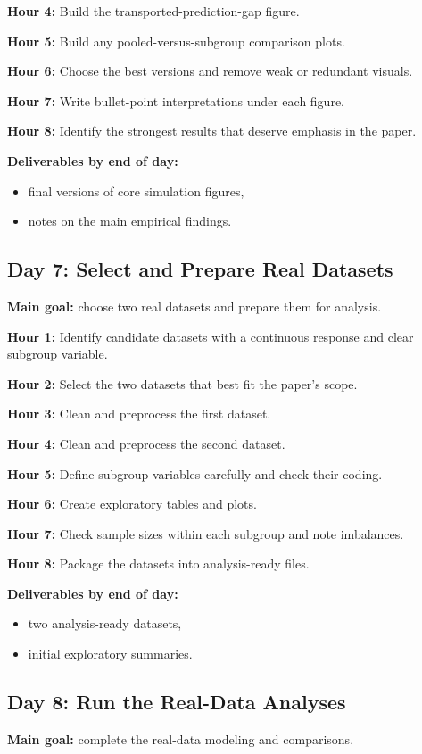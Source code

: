 \documentclass[11pt]{article}
\begin{document}
\textbf{Hour 4:} Build the transported-prediction-gap figure.

\textbf{Hour 5:} Build any pooled-versus-subgroup comparison plots.

\textbf{Hour 6:} Choose the best versions and remove weak or redundant visuals.

\textbf{Hour 7:} Write bullet-point interpretations under each figure.

\textbf{Hour 8:} Identify the strongest results that deserve emphasis in the paper.

\textbf{Deliverables by end of day:}
\begin{itemize}
    \item final versions of core simulation figures,
    \item notes on the main empirical findings.
\end{itemize}

\subsection*{Day 7: Select and Prepare Real Datasets}
\textbf{Main goal:} choose two real datasets and prepare them for analysis.

\textbf{Hour 1:} Identify candidate datasets with a continuous response and clear subgroup variable.

\textbf{Hour 2:} Select the two datasets that best fit the paper's scope.

\textbf{Hour 3:} Clean and preprocess the first dataset.

\textbf{Hour 4:} Clean and preprocess the second dataset.

\textbf{Hour 5:} Define subgroup variables carefully and check their coding.

\textbf{Hour 6:} Create exploratory tables and plots.

\textbf{Hour 7:} Check sample sizes within each subgroup and note imbalances.

\textbf{Hour 8:} Package the datasets into analysis-ready files.

\textbf{Deliverables by end of day:}
\begin{itemize}
    \item two analysis-ready datasets,
    \item initial exploratory summaries.
\end{itemize}

\subsection*{Day 8: Run the Real-Data Analyses}
\textbf{Main goal:} complete the real-data modeling and comparisons.
\end{document}
